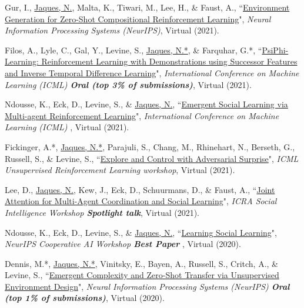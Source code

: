 \documentclass[paper=letter,fontsize=11pt]{scrartcl} %
\newcommand{\PaperEntry}[6]{
        \noindent #1, ``\href{#6}{#2}", \textit{#3}, #4 (#5).}
\begin{document}
\begin{etaremune}
\item \PaperEntry{Gur, I., \underline{Jaques, N.}, Malta, K., Tiwari, M., Lee, H., \& Faust, A.}{Environment Generation for Zero-Shot Compositional Reinforcement Learning}{Neural Information Processing Systems (NeurIPS)}{Virtual}{2021}{https://papers.nips.cc/paper/2021/file/218344619d8fb95d504ccfa11804073f-Paper.pdf }

\item \PaperEntry{Filos, A., Lyle, C., Gal, Y., Levine, S., \underline{Jaques, N.*}, \& Farquhar, G.*}{PsiPhi-Learning: Reinforcement Learning with Demonstrations using Successor Features and Inverse Temporal Difference Learning}{International Conference on Machine Learning (ICML) \textbf{Oral (top 3\% of submissions)}}{Virtual}{2021}{https://arxiv.org/pdf/2102.12560.pdf}

\item \PaperEntry{Ndousse, K., Eck, D., Levine, S., \& \underline{Jaques, N.}}{Emergent Social Learning via Multi-agent Reinforcement Learning}{International Conference on Machine Learning (ICML) }{Virtual}{2021}{https://arxiv.org/abs/2010.00581}

\item \PaperEntry{Fickinger, A.*, \underline{Jaques, N.*}, Parajuli, S., Chang, M., Rhinehart, N., Berseth, G., Russell, S., \& Levine, S.}{Explore and Control with Adversarial Surprise}{ICML Unsupervised Reinforcement Learning workshop}{Virtual}{2021}{https://arxiv.org/abs/2107.07394}

\item \PaperEntry{Lee, D., \underline{Jaques, N.}, Kew, J., Eck, D., Schuurmans, D., \& Faust, A.}{Joint Attention for Multi-Agent Coordination and Social Learning}{ICRA Social Intelligence Workshop \textbf{Spotlight talk}}{Virtual}{2021}{https://arxiv.org/abs/2104.07750}

\item \PaperEntry{Ndousse, K., Eck, D., Levine, S., \& \underline{Jaques, N.}}{Learning Social Learning}{NeurIPS Cooperative AI Workshop \textbf{Best Paper} }{Virtual}{2020}{https://arxiv.org/abs/2010.00581}

\item \PaperEntry{Dennis, M.*, \underline{Jaques, N.*}, Vinitsky, E., Bayen, A., Russell, S., Critch, A., \& Levine, S.}{Emergent Complexity and Zero-Shot Transfer via Unsupervised Environment Design}{Neural Information Processing Systems (NeurIPS) \textbf{Oral (top 1\% of submissions)}}{Virtual}{2020}{https://arxiv.org/abs/2012.02096}


\end{etaremune}
\end{document}
